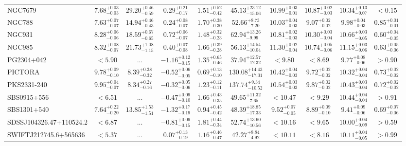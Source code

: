 \documentclass[onecolumn]{mn2e}
\begin{document}
\begin{landscape}
{\begin{center}
\begin{longtable}{lccccccccc}
NGC7679 & $7.68_{-0.03}^{+0.03}$ & $29.20_{-0.59}^{+0.46}$ & $0.29_{-0.17}^{+0.21}$ & $1.51_{-0.42}^{+0.52}$ &$45.13_{-15.06}^{+23.12}$ & $10.99_{-0.01}^{+0.03}$ & $10.87_{-0.03}^{+0.02}$ & $10.34_{-0.07}^{+0.13}$ & $<0.15$ \\
NGC788 & $7.63_{-0.07}^{+0.07}$ & $14.94_{-0.43}^{+0.46}$ & $0.24_{-0.07}^{+0.08}$ & $1.70_{-0.30}^{+0.38}$ &$52.66_{-7.20}^{+8.73}$ & $10.03_{-0.03}^{+0.04}$ & $9.07_{-0.02}^{+0.02}$ & $9.98_{-0.03}^{+0.04}$ & $0.85_{-0.01}^{+0.01}$ \\
NGC931 & $8.28_{-0.06}^{+0.06}$ & $18.59_{-0.65}^{+0.67}$ & $0.72_{-0.07}^{+0.06}$ & $1.48_{-0.23}^{+0.32}$ &$62.94_{-9.99}^{+13.26}$ & $10.81_{-0.03}^{+0.02}$ & $10.30_{-0.04}^{+0.03}$ & $10.66_{-0.05}^{+0.03}$ & $0.60_{-0.05}^{+0.04}$ \\
NGC985 & $8.32_{-0.07}^{+0.08}$ & $21.73_{-1.15}^{+1.08}$ & $0.40_{-0.08}^{+0.07}$ & $1.66_{-0.28}^{+0.39}$ &$56.13_{-10.04}^{+14.54}$ & $11.30_{-0.04}^{+0.02}$ & $10.74_{-0.06}^{+0.05}$ & $11.15_{-0.06}^{+0.03}$ & $0.63_{-0.06}^{+0.05}$ \\
PG2304+042 & $<5.90$ & ... & $-1.16_{-0.15}^{+0.12}$ & $1.35_{-0.46}^{+0.65}$ &$37.94_{-12.32}^{+12.57}$ & $<9.80$ & $<8.69$ & $9.77_{-0.06}^{+0.08}$ & $>0.90$ \\
PICTORA & $9.78_{-0.10}^{+0.09}$ & $8.39_{-0.32}^{+0.38}$ & $-0.52_{-0.05}^{+0.06}$ & $0.69_{-0.10}^{+0.13}$ &$130.08_{-17.31}^{+14.43}$ & $10.42_{-0.03}^{+0.04}$ & $9.72_{-0.02}^{+0.02}$ & $10.32_{-0.04}^{+0.04}$ & $0.73_{-0.02}^{+0.02}$ \\
PKS2331-240 & $9.95_{-0.07}^{+0.04}$ & $8.34_{-0.16}^{+0.27}$ & $-0.32_{-0.06}^{+0.05}$ & $1.23_{-0.11}^{+0.12}$ &$137.74_{-10.52}^{+9.34}$ & $10.54_{-0.03}^{+0.03}$ & $9.87_{-0.02}^{+0.02}$ & $10.43_{-0.04}^{+0.03}$ & $0.72_{-0.02}^{+0.02}$ \\
SBS0915+556 & $<6.51$ & ... & $-0.47_{-0.10}^{+0.09}$ & $1.66_{-0.35}^{+0.43}$ &$49.65_{-7.65}^{+11.32}$ & $<10.47$ & $<9.29$ & $10.44_{-0.04}^{+0.04}$ & $>0.91$ \\
SBS1301+540 & $7.64_{-0.20}^{+0.22}$ & $13.85_{-1.51}^{+1.53}$ & $-1.32_{-0.19}^{+0.17}$ & $0.94_{-0.42}^{+0.45}$ &$48.39_{-17.33}^{+18.85}$ & $9.52_{-0.05}^{+0.07}$ & $8.89_{-0.10}^{+0.09}$ & $9.41_{-0.06}^{+0.09}$ & $0.69_{-0.06}^{+0.07}$ \\
SDSSJ104326.47+110524.2 & $<6.87$ & ... & $-0.81_{-0.15}^{+0.09}$ & $1.81_{-0.34}^{+0.44}$ &$52.74_{-10.56}^{+13.60}$ & $<10.16$ & $<9.65$ & $10.00_{-0.09}^{+0.04}$ & $>0.59$ \\
SWIFTJ212745.6+565636 & $<5.37$ & ... & $0.07_{-0.19}^{+0.13}$ & $1.16_{-0.47}^{+0.46}$ &$42.27_{-4.92}^{+8.84}$ & $<10.11$ & $<8.16$ & $10.11_{-0.05}^{+0.04}$ & $>0.99$ \\

\end{longtable}
\end{center}}
\end{landscape}
\end{document}
